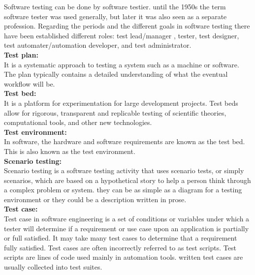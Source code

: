\hspace*{0.82cm}Software testing can be done by software testier. until the 1950s the term software tester was used generally, 
but later it was also seen as a separate profession. Regarding the periods and the different goals in software testing there 
have been established different roles: test lead/manager , tester, test designer, test automater/automation developer, and test 
administrator.\\[0.5cm]
\newpage
\textbf{Test plan:}\\
\hspace*{0.82cm}It is a systematic approach to testing a system such as a machine or software. The plan typically contains a detailed understanding of what the eventual
workflow will be.\\[0.5cm] 
\textbf{Test bed:}\\
\hspace*{0.82cm}It is a platform for experimentation for large development projects. Test beds allow for rigorous, transparent and 
replicable testing of scientific theories, computational tools, and other new technologies.\\[0.5cm]
\textbf{Test environment:}\\
\hspace*{0.82cm}In software, the hardware and software requirements are known as the test bed. This is also known as the test 
environment.\\[0.5cm]
\textbf{Scenario testing:}\\
\hspace*{0.82cm}Scenario testing is a software testing activity that uses scenario tests, or simply scenarios, which are based on 
a hypothetical story to help a person think through a complex problem or system. they can be as simple as a diagram for a testing 
environment or they could be a description written in prose.\\[0.5cm]
\textbf{Test case:}\\
\hspace*{0.82cm}Test case in software engineering is a set of conditions or variables under which a tester will determine if a 
requirement or use case upon an application is partially or full satisfied. It may take many test cases to determine that a 
requirement fully satisfied. Test cases are often incorrectly referred to as test scripts. Test scripts are lines of code used 
mainly in automation tools. written test cases are usually collected into test suites.\\[0.5cm]
